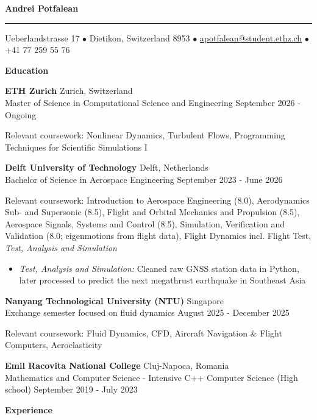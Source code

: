 \documentclass[11pt]{article}
\newcommand{\cvsection}[1]{%
  \vspace{10pt}%
  \centerline{\textbf{#1}}%
  \vspace{8pt}%
}
\newcommand{\cventry}[4]{%
  \textbf{#1} \hfill #2 \\
  #3 \hfill #4\par
}
\newcommand{\cvgap}{\vspace{0.7em}}
\begin{document}
\begin{center}
  {\LARGE\textbf{Andrei Potfalean}}
\end{center}
\vspace{0.8pt}
\hrule
\vspace{12pt}
\centerline{Ueberlandstrasse 17 $\bullet$ Dietikon, Switzerland 8953 $\bullet$
  \href{mailto:apotfalean@student.ethz.ch}{apotfalean@student.ethz.ch} $\bullet$ +41 77 259 55 76}

\cvsection{Education}

\cventry{ETH Zurich}{Zurich, Switzerland}
  {Master of Science in Computational Science and Engineering}{September 2026 - Ongoing}
Relevant coursework: Nonlinear Dynamics, Turbulent Flows, Programming Techniques for Scientific Simulations I
\cvgap

\cventry{Delft University of Technology}{Delft, Netherlands}
  {Bachelor of Science in Aerospace Engineering}{September 2023 - June 2026}
Relevant coursework: Introduction to Aerospace Engineering (8.0), Aerodynamics Sub- and Supersonic (8.5), Flight and Orbital Mechanics and Propulsion (8.5), Aerospace Signals, Systems and Control (8.5), Simulation, Verification and Validation (8.0; eigenmotions from flight data), Flight Dynamics incl. Flight Test, \textit{Test, Analysis and Simulation}
\begin{itemize}
  \item \textit{Test, Analysis and Simulation:} Cleaned raw GNSS station data in Python, later processed to predict the next megathrust earthquake in Southeast Asia
\end{itemize}
\cvgap

\cventry{Nanyang Technological University (NTU)}{Singapore}
  {Exchange semester focused on fluid dynamics}{August 2025 - December 2025}
Relevant coursework: Fluid Dynamics, CFD, Aircraft Navigation \& Flight Computers, Aeroelasticity
\cvgap

\cventry{Emil Racovita National College}{Cluj-Napoca, Romania}
  {Mathematics and Computer Science - Intensive C++ Computer Science (High school)}{September 2019 - July 2023}

\cvsection{Experience}
\end{document}

